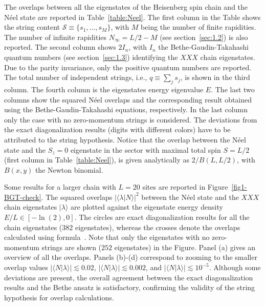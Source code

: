 \documentclass[11pt]{iopart}
\begin{document}
The overlaps between all the eigenstates of the Heisenberg spin chain and the N\'eel 
state are reported in Table~\ref{table:Neel}. The first column in the Table shows 
the string content ${\mathcal S}\equiv\{s_1,\dots,s_M\}$, with $M$ being the number 
of finite rapidities. The number of infinite rapidities $N_{\infty}=L/2-M$ (see 
section~\ref{sec:1.2}) is also reported. The second column shows $2I_n$, with $I_n$ 
the Bethe-Gaudin-Takahashi quantum numbers (see section~\ref{sec:1.3}) identifying 
the $XXX$ chain eigenstates. Due to the parity invariance, only the positive quantum 
numbers are reported. The total number of independent strings, i.e., $q\equiv\sum_js_j$, 
is shown in the third column. The fourth column is the eigenstates energy eigenvalue 
$E$. The last two columns show the squared N\'eel overlaps and the corresponding result 
obtained using the Bethe-Gaudin-Takahashi equations, respectively. In the last 
column only the case with no zero-momentum strings is considered. The deviations 
from the exact diagonalization results (digits with different colors) have to be 
attributed to the string hypothesis. Notice that the overlap between the N\'eel 
state and the $S_z=0$ eigenstate in the sector with maximal total spin $S=L/2$ 
(first column in Table~\ref{table:Neel}), is given analytically as $2/B(L,L/2)$, 
with $B(x,y)$ the Newton binomial. 

Some results for a larger chain with $L=20$ sites are reported in 
Figure~\ref{fig1-BGT-check}.  The squared overlaps $|\langle\lambda|
N\rangle|^2$ between the N\'eel state and the $XXX$ chain eigenstates $|\lambda
\rangle$ are plotted against the eigenstate energy density $E/L
\in[-\ln(2),0]$. The circles are exact diagonalization results for all 
the chain eigenstates ($382$ eigenstates), whereas the crosses denote the 
overlaps calculated using formula~. Note that only the 
eigenstates with no zero-momentum strings are shown ($252$ eigenstates) 
in the Figure. Panel (a) gives an overview of all the overlaps. Panels (b)-(d) 
correspond to zooming to the smaller overlap values $|\langle N|\lambda
\rangle|\lesssim 0.02$, $|\langle N|\lambda\rangle|\lesssim 0.002$, and 
$|\langle N|\lambda\rangle|\lesssim 10^{-5}$. 
Although some deviations are present, the overall agreement between the exact 
diagonalization results and the Bethe ansatz is satisfactory, confirming 
the validity of the string hypothesis for overlap calculations. 
\end{document}
